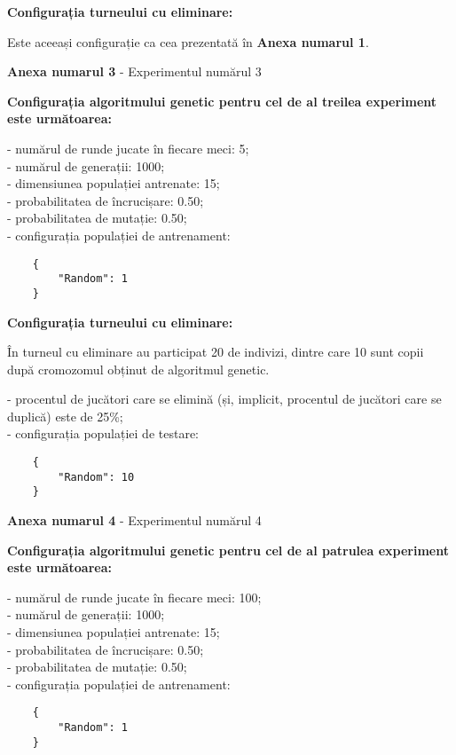 \textbf{Configurația turneului cu eliminare:}

Este aceeași configurație ca cea prezentată în \textbf{Anexa numarul 1}.

\clearpage

\begin{center}
	\textbf{Anexa numarul 3} - Experimentul numărul 3
\end{center}

\textbf{Configurația algoritmului genetic pentru cel de al treilea experiment este următoarea:}

- numărul de runde jucate în fiecare meci: 5;\\
- numărul de generații: 1000;\\
- dimensiunea populației antrenate: 15;\\
- probabilitatea de încrucișare: 0.50;\\
- probabilitatea de mutație: 0.50;\\
- configurația populației de antrenament:\\
\begin{center}
	\begin{lstlisting}
	{
		"Random": 1
	}
	\end{lstlisting}
\end{center}

\textbf{Configurația turneului cu eliminare:}

În turneul cu eliminare au participat 20 de indivizi, dintre care 10 sunt copii după cromozomul obținut de algoritmul genetic. 

- procentul de jucători care se elimină (și, implicit, procentul de jucători care se duplică) este de 25\%;\\
- configurația populației de testare:\\
\begin{center}
	\begin{lstlisting}
	{
		"Random": 10
	}
	\end{lstlisting}
\end{center}

\clearpage

\begin{center}
	\textbf{Anexa numarul 4} - Experimentul numărul 4
\end{center}

\textbf{Configurația algoritmului genetic pentru cel de al patrulea experiment este următoarea:}

- numărul de runde jucate în fiecare meci: 100;\\
- numărul de generații: 1000;\\
- dimensiunea populației antrenate: 15;\\
- probabilitatea de încrucișare: 0.50;\\
- probabilitatea de mutație: 0.50;\\
- configurația populației de antrenament:\\
\begin{center}
	\begin{lstlisting}
	{
		"Random": 1
	}
	\end{lstlisting}
\end{center}

